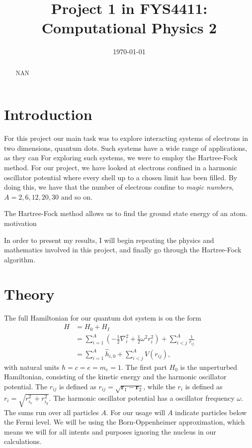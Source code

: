 \documentclass[11pt]{article}
\title{Project 1 in FYS4411: Computational Physics 2}
\author{}
\date{\today}
\newcommand{\husk}[1]{\color{red} #1 \color{black}}
\begin{document}
\maketitle

\begin{abstract}
NAN
\end{abstract}

\section{Introduction}
For this project our main task was to explore interacting systems of electrons in two dimensions, quantum dots. Such systems have a wide range of applications, as they can  For exploring such systems, we were to employ the Hartree-Fock method. For our project, we have looked at electrons confined in a harmonic oscillator potential where every shell up to a chosen limit has been filled. By doing this, we have that the number of electrons confine to \textit{magic numbers}, $A = 2, 6, 12, 20, 30$ and so on.

The Hartree-Fock method allows us to find the ground state energy of an atom.
\husk{motivation}

In order to present my results, I will begin repeating the physics and mathematics involved in this project, and finally go through the Hartree-Fock algorithm.


\section{Theory}
The full Hamiltonian for our quantum dot system is on the form
\begin{align}
	H &= H_0 + H_I \nonumber \\
	&= \sum^A_{i=1} \left( -\frac{1}{2}\nabla^2_i + \frac{1}{2}\omega^2 r^2_i \right) + \sum^A_{i<j}\frac{1}{r_{ij}} \\
	&= \sum^A_{i=1} \hat{h}_{i,0} + \sum^A_{i<j}V(r_{ij}),
	\label{eq:full-hamiltonian}
\end{align}
with natural units $\hbar = c = e = m_e = 1$. The first part $H_0$ is the unperturbed Hamiltonian, consisting of the kinetic energy and the harmonic oscillator potential. The $r_{ij}$ is defined as $r_{ij} = \sqrt{\mathbf{r}_1 - \mathbf{r}_2}$, while the $r_i$ is defined as $r_i = \sqrt{r^2_{i_x} + r^2_{i_y}}$. The harmonic oscillator potential has a oscillator frequency $\omega$. The sums run over all particles $A$. For our usage will $A$ indicate particles below the Fermi level. We will be using the Born-Oppenheimer approximation, which means we will for all intents and purposes ignoring the nucleus in our calculations.
\end{document}
